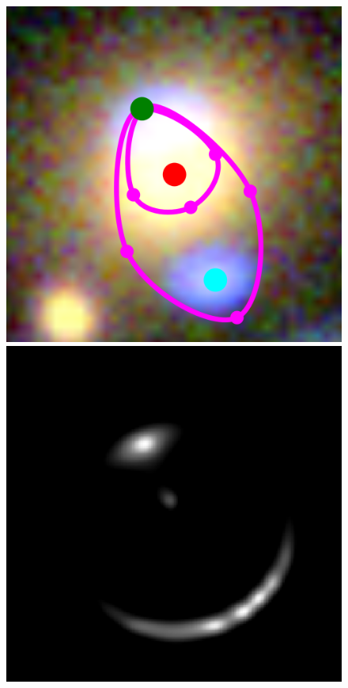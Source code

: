 \documentclass[usenatbib]{mn2e}
\newlength{\myplotswidth}
\begin{document}
\begin{figure}
  \centering

  \includegraphics[width=\myplotswidth]{fig/006937_input}
  \includegraphics[width=\myplotswidth]{fig/006937_arr_time_ipol} \\

\end{figure}
\end{document}
